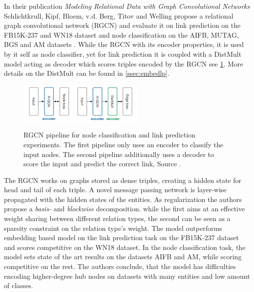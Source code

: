 

In their publication \textit{Modeling Relational Data with Graph Convolutional Networks} Schlichtkrull, Kipf, Bloem, v.d. Berg, Titov and Welling propose a relational graph convolutional network (RGCN) and evaluate it on link prediction on the FB15K-237 and WN18 dataset and node classification on the AIFB, MUTAG, BGS and AM datasets \cite{gangemi_modeling_2018}. While the RGCN with its encoder properties, it is used by it self as node classifier, yet for link prediction it is coupled with a DistMult model acting as decoder which scores triples encoded by the RGCN see \ref{fig:RGCN}. More details on the DistMult can be found in \ref{ssec:embedlp}.

\begin{figure}[h]
    \centering
    \includegraphics[width=0.55\textwidth]{data/images/RGCN.png}
    \label{fig:RGCN}
    \caption{RGCN pipeline for node classification and link prediction experiments. The first pipeline only uses an encoder to classify the input nodes. The second pipeline additionally uses a decoder to score the input and predict the correct link, Source \cite{gangemi_modeling_2018}.}
\end{figure}

The RGCN works on graphs stored as dense triples, creating a hidden state for head and tail of each triple. A novel message passing network is layer-wise propagated with the hidden states of the entities. As regularization the authors propose a \textit{basis-} and \textit{blockwise} decomposition. while the first  aims at an effective weight sharing between different relation types, the second  can be seen as a sparsity constraint on the relation type's weight. The model outperforms embedding based model on the link prediction task on the FB15K-237 dataset and scores competitive on the WN18 dataset. In the node classification task, the model sets state of the art results on the datasets AIFB and AM, while scoring competitive on the rest. The authors conclude, that the model has difficulties encoding higher-degree hub nodes on datasets with many entities and low amount of classes.


